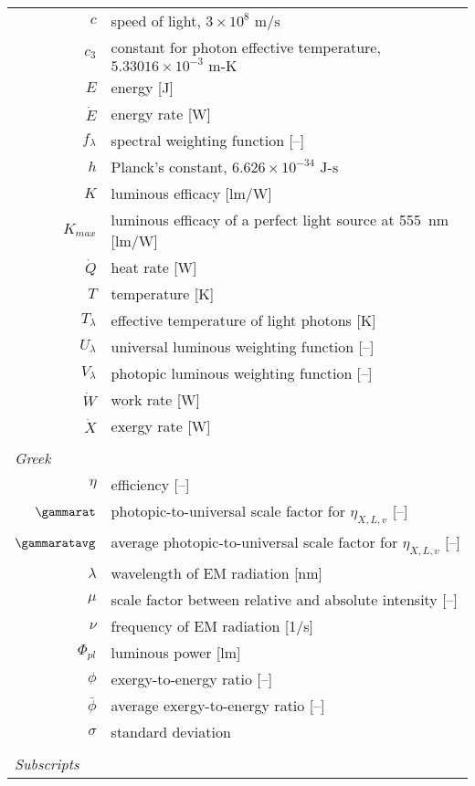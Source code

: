 \begin{center}
\begin{longtable}{r l}
  $c$ & speed of light, $3 \times 10^8 \text{ m/s}$ \\
  $c_3$ & constant for photon effective temperature, $5.33016 \times 10^{-3} \text{ m-K}$ \\
  $E$ & energy [J] \\
  $\dot{E}$ & energy rate [W] \\
  $f_\lambda$ & spectral weighting function [--] \\
  $h$ & Planck's constant, $6.626 \times 10^{-34} \text{ J-s}$ \\
  $K$ & luminous efficacy [lm/W] \\
  $K_{max}$ & luminous efficacy of a perfect light source at 555~nm [lm/W] \\
  $\dot{Q}$ & heat rate [W] \\
  $T$ & temperature [K] \\
  $T_\lambda$ & effective temperature of light photons [K] \\
  $U_\lambda$ & universal luminous weighting function [--] \\
  $V_\lambda$ & photopic luminous weighting function [--] \\
  $\dot{W}$ & work rate [W] \\
  $\dot{X}$ & exergy rate [W] \\
%
\multicolumn{2}{l}{} \\ %
\multicolumn{2}{l}{\emph{Greek}} \\ 
%
  $\eta$ & efficiency [--] \\
  $\gammarat$ & photopic-to-universal scale factor for $\eta_{X,L,v}$ [--] \\
  $\gammaratavg$ & average photopic-to-universal scale factor for $\eta_{X,L,v}$ [--] \\
  $\lambda$ & wavelength of EM radiation [nm] \\
  $\mu$ & scale factor between relative and absolute intensity [--] \\
  $\nu$ & frequency of EM radiation [1/s] \\
  $\Phi_{pl}$ & luminous power [lm] \\
  $\phi$ & exergy-to-energy ratio [--] \\
  $\bar{\phi}$ & average exergy-to-energy ratio [--] \\
  $\sigma$ & standard deviation \\
%
\multicolumn{2}{l}{} \\ %
\multicolumn{2}{l}{\emph{Subscripts}} \\ 
%

\end{longtable}
\end{center}
